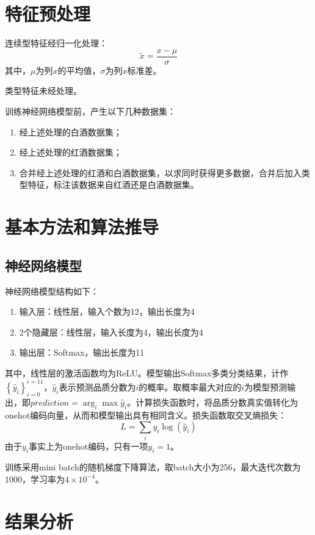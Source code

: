 \documentclass{article}
\begin{document}
\section{特征预处理}

连续型特征经归一化处理：
$$
\tilde{x} = \frac{x - \mu}{\sigma}
$$
其中，$\mu$为列$x$的平均值，$\sigma$为列$x$标准差。

类型特征未经处理。

训练神经网络模型前，产生以下几种数据集：

\begin{enumerate}
    \item 经上述处理的白酒数据集；
    \item 经上述处理的红酒数据集；
    \item 合并经上述处理的红酒和白酒数据集，以求同时获得更多数据，合并后加入类型特征，标注该数据来自红酒还是白酒数据集。
\end{enumerate}

\section{基本方法和算法推导}
\subsection{神经网络模型}

神经网络模型结构如下：

\begin{enumerate}
    \item 输入层：线性层，输入个数为12，输出长度为4
    \item 2个隐藏层：线性层，输入长度为4，输出长度为4
    \item 输出层：Softmax，输出长度为11
\end{enumerate}

其中，线性层的激活函数均为ReLU。模型输出Softmax多类分类结果，计作$\left\{\hat y_i\right\}_{i=0}^{i=11}$，$\hat y_i$表示预测品质分数为$i$的概率。取概率最大对应的$i$为模型预测输出，即$prediction=\arg_i\max \hat y_i$。计算损失函数时，将品质分数真实值转化为onehot编码向量，从而和模型输出具有相同含义。损失函数取交叉熵损失：
$$
L = \sum_i y_i \log(\hat y_i)
$$
由于$y_i$事实上为onehot编码，只有一项$y_i=1$。

训练采用mini batch的随机梯度下降算法，取batch大小为256，最大迭代次数为1000，学习率为$4\times10^{-4}$。

\section{结果分析}
\end{document}
